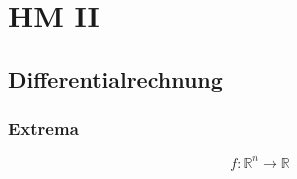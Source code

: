 \documentclass[twoside]{article}
\begin{document}
	\clearpage
			
	\section{HM II}
	
		\subsection{Differentialrechnung}
			
			\subsubsection{Extrema}
				
				\begin{displaymath}
					f: \mathbb{R}^n \to \mathbb{R}
				\end{displaymath}
				
\end{document}
